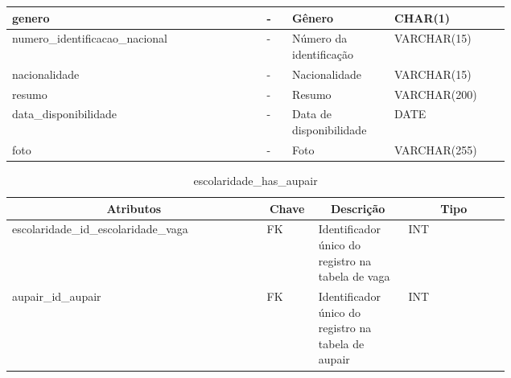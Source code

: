 \begin{enumerate}
\begin{table}[H]
\begin{tabular}{|p{0.40\linewidth} | p{0.04\linewidth} |  p{0.12\linewidth} | p{0.16\linewidth} |}
        genero  &  
        - & 
        Gênero &
        CHAR(1)
        \\  \hline
        
        numero\_identificacao\_nacional  &  
        - & 
        Número da identificação &
        VARCHAR(15)
        \\  \hline
        
        nacionalidade  &  
        - & 
        Nacionalidade &
        VARCHAR(15)
        \\  \hline
        
        resumo  &  
        - & 
        Resumo &
        VARCHAR(200)
        \\  \hline
        
        data\_disponibilidade  &  
        - & 
        Data de disponibilidade &
        DATE
        \\  \hline
        
        foto  &  
        - & 
        Foto &
        VARCHAR(255)
        \\  \hline
       
        \end{tabular}
    \end{table}
\end{enumerate}

\begin{enumerate}
    \begin{table}[H]
    \caption{escolaridade\_has\_aupair}
    \label{idioma}
    	\centering\footnotesize
        \begin{tabular}{|p{0.40\linewidth} | p{0.04\linewidth} |  p{0.12\linewidth} | p{0.16\linewidth} |}  \hline
        \multicolumn{1}{|c|}{\textbf{Atributos}} &
        \multicolumn{1}{|c|}{\textbf{Chave}} &
        \multicolumn{1}{c|}{\textbf{Descrição}} &
        \multicolumn{1}{c|}{\textbf{Tipo}} \\ \hline
          
        escolaridade\_id\_escolaridade\_vaga  &  
        FK & 
        Identificador único do registro na tabela de vaga &
        INT
        \\  \hline
        
        aupair\_id\_aupair &  
        FK & 
        Identificador único do registro na tabela de aupair &
        INT
        \\  \hline
       
        \end{tabular}
    \end{table}
\end{enumerate}



